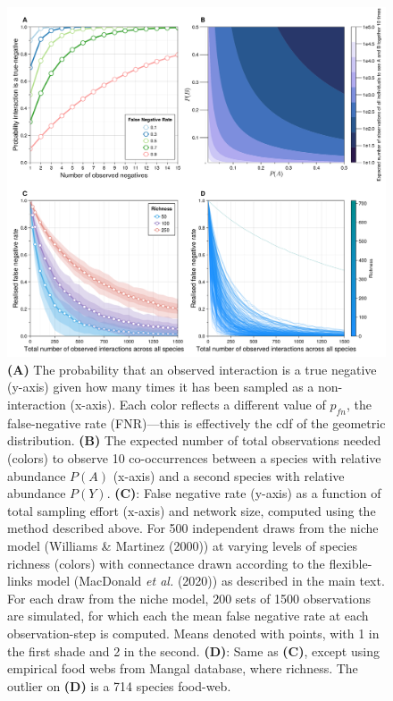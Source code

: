 \documentclass[11pt]{article}
\makeatletter
\def\maxwidth{\ifdim\Gin@nat@width>\linewidth\linewidth
\else\Gin@nat@width\fi}
\let\Oldincludegraphics\includegraphics
\renewcommand{\includegraphics}[1]{\Oldincludegraphics[width=\maxwidth]{#1}}
\makeatother
\begin{document}
\begin{figure}
\hypertarget{fig:geometric}{%
\centering
\includegraphics{./figures/fig1.png}
\caption{\textbf{(A)} The probability that an observed interaction is a
true negative (y-axis) given how many times it has been sampled as a
non-interaction (x-axis). Each color reflects a different value of
\(p_{fn}\), the false-negative rate (FNR)---this is effectively the cdf
of the geometric distribution. \textbf{(B)} The expected number of total
observations needed (colors) to observe 10 co-occurrences between a
species with relative abundance \(P(A)\) (x-axis) and a second species
with relative abundance \(P(Y)\). \textbf{(C)}: False negative rate
(y-axis) as a function of total sampling effort (x-axis) and network
size, computed using the method described above. For 500 independent
draws from the niche model (Williams \& Martinez (2000)) at varying
levels of species richness (colors) with connectance drawn according to
the flexible-links model (MacDonald \emph{et al.} (2020)) as described
in the main text. For each draw from the niche model, 200 sets of 1500
observations are simulated, for which each the mean false negative rate
at each observation-step is computed. Means denoted with points, with 1
in the first shade and 2 in the second. \textbf{(D)}: Same as
\textbf{(C)}, except using empirical food webs from Mangal database,
where richness. The outlier on \textbf{(D)} is a 714 species
food-web.}\label{fig:geometric}
}
\end{figure}
\end{document}
